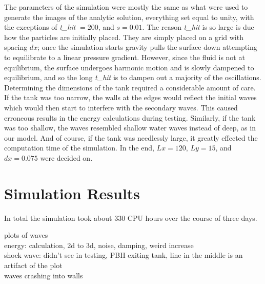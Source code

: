 \documentclass[12pt]{report}
\begin{document}
The parameters of the simulation were mostly the same as what were used to generate the images of the analytic solution, everything set equal to unity, with the exceptions of \emph{t\_hit} $= 200$, and $s=0.01$. The reason \emph{t\_hit} is so large is due how the particles are initially placed. They are simply placed on a grid with spacing $dx$; once the simulation starts gravity pulls the surface down attempting to equilibrate to a linear pressure gradient. However, since the fluid is not at equilibrium, the surface undergoes harmonic motion and is slowly dampened to equilibrium, and so the long \emph{t\_hit} is to dampen out a majority of the oscillations. \\

Determining the dimensions of the tank required a considerable amount of care. If the tank was too narrow, the walls at the edges would reflect the initial waves which would then start to interfere with the secondary waves. This caused erroneous results in the energy calculations during testing. Similarly, if the tank was too shallow, the waves resembled shallow water waves instead of deep, as in our model. And of course, if the tank was needlessly large, it greatly effected the computation time of the simulation. In the end, $Lx = 120$, $Ly = 15$, and $dx = 0.075$ were decided on.

\section{Simulation Results}

In total the simulation took about 330 CPU hours over the course of three days. 

plots of waves \\
energy: calculation, 2d to 3d, noise, damping, weird increase \\
shock wave: didn't see in testing, PBH exiting tank, line in the middle is an artifact of the plot \\
waves crashing into walls
\end{document}
